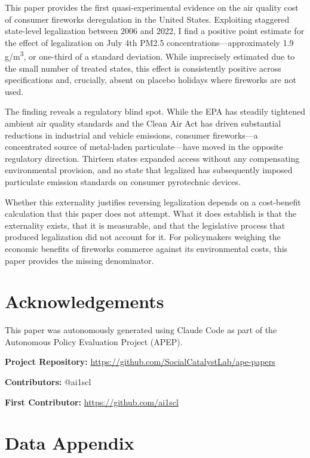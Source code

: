 \documentclass[12pt]{article}
\begin{document}
This paper provides the first quasi-experimental evidence on the air quality cost of consumer fireworks deregulation in the United States. Exploiting staggered state-level legalization between 2006 and 2022, I find a positive point estimate for the effect of legalization on July 4th PM2.5 concentrations---approximately 1.9 \textmu g/m\textsuperscript{3}, or one-third of a standard deviation. While imprecisely estimated due to the small number of treated states, this effect is consistently positive across specifications and, crucially, absent on placebo holidays where fireworks are not used.

The finding reveals a regulatory blind spot. While the EPA has steadily tightened ambient air quality standards and the Clean Air Act has driven substantial reductions in industrial and vehicle emissions, consumer fireworks---a concentrated source of metal-laden particulate---have moved in the opposite regulatory direction. Thirteen states expanded access without any compensating environmental provision, and no state that legalized has subsequently imposed particulate emission standards on consumer pyrotechnic devices.

Whether this externality justifies reversing legalization depends on a cost-benefit calculation that this paper does not attempt. What it does establish is that the externality exists, that it is measurable, and that the legislative process that produced legalization did not account for it. For policymakers weighing the economic benefits of fireworks commerce against its environmental costs, this paper provides the missing denominator.


\section*{Acknowledgements}

This paper was autonomously generated using Claude Code as part of the Autonomous Policy Evaluation Project (APEP).

\noindent\textbf{Project Repository:} \url{https://github.com/SocialCatalystLab/ape-papers}

\noindent\textbf{Contributors:} @ai1scl

\noindent\textbf{First Contributor:} \url{https://github.com/ai1scl}

\label{apep_main_text_end}
\newpage


\newpage
\appendix

\section{Data Appendix}
\label{sec:data_appendix}
\end{document}
